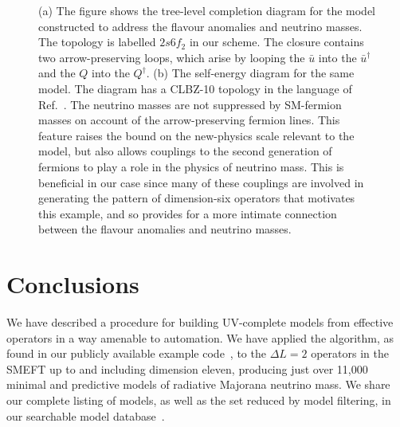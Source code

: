\begin{figure}[t]
  \centering
  \caption[(a) The figure shows the tree-level completion diagram for the model
  constructed to address the flavour anomalies and neutrino masses. (b) The
  self-energy diagram for the same model.]{(a) The figure shows the tree-level
    completion diagram for the model constructed to address the flavour
    anomalies and neutrino masses. The topology is labelled $2s6f_{2}$ in our
    scheme. The closure contains two arrow-preserving loops, which arise by
    looping the $\bar{u}$ into the $\bar{u}^{\dagger}$ and the $Q$ into the
    $Q^{\dagger}$. (b) The self-energy diagram for the same model. The diagram
    has a CLBZ-10 topology in the language of Ref.~\cite{Sierra:2014rxa}. The
    neutrino masses are not suppressed by SM-fermion masses on account of the
    arrow-preserving fermion lines. This feature raises the bound on the
    new-physics scale relevant to the model, but also allows couplings to the
    second generation of fermions to play a role in the physics of neutrino
    mass. This is beneficial in our case since many of these couplings are
    involved in generating the pattern of dimension-six operators that motivates
    this example, and so provides for a more intimate connection between the
    flavour anomalies and neutrino masses.}
  \label{fig:flavour-anomalies-model-diagrams}
\end{figure}


\section{Conclusions}
\label{sec:conclusions}

We have described a procedure for building UV-complete models from effective
operators in a way amenable to automation. We have applied the algorithm, as
found in our publicly available example code~\cite{neutrinomass2020}, to the
$\Delta L = 2$ operators in the SMEFT up to and including dimension eleven,
producing just over 11,000 minimal and predictive models of radiative Majorana
neutrino mass. We share our complete listing of models, as well as the set
reduced by model filtering, in our searchable model
database~\cite{gargalionis_john_2020_4054618}.

